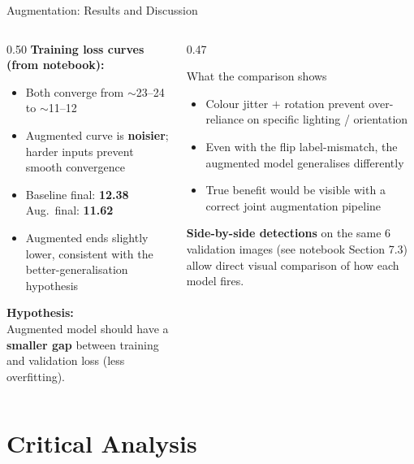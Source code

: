 \documentclass[aspectratio=169, 10pt]{beamer}
\begin{document}
\begin{frame}{Augmentation: Results and Discussion}
\begin{columns}[T]
\begin{column}{0.50\textwidth}
  \textbf{Training loss curves (from notebook):}
  \begin{itemize}
    \item Both converge from $\sim$23–24 to $\sim$11–12
    \item Augmented curve is \textbf{noisier}; harder inputs
      prevent smooth convergence
    \item Baseline final: \textbf{12.38} \quad Aug.\ final: \textbf{11.62}
    \item Augmented ends slightly lower, consistent with
      the better-generalisation hypothesis
  \end{itemize}

  \vspace{0.1cm}
  \textbf{Hypothesis:}\\
  Augmented model should have a \textbf{smaller gap}
  between training and validation loss (less overfitting).
\end{column}
\begin{column}{0.47\textwidth}
  \begin{block}{What the comparison shows}
    \begin{itemize}
      \item Colour jitter $+$ rotation prevent over-reliance
        on specific lighting / orientation
      \item Even with the flip label-mismatch, the
        augmented model generalises differently
      \item True benefit would be visible with a correct
        joint augmentation pipeline
    \end{itemize}
  \end{block}

  \vspace{0.1cm}
  \textbf{Side-by-side detections} on the same 6 validation
  images (see notebook Section 7.3) allow direct visual
  comparison of how each model fires.
\end{column}
\end{columns}
\end{frame}

\section{Critical Analysis}
\end{document}
